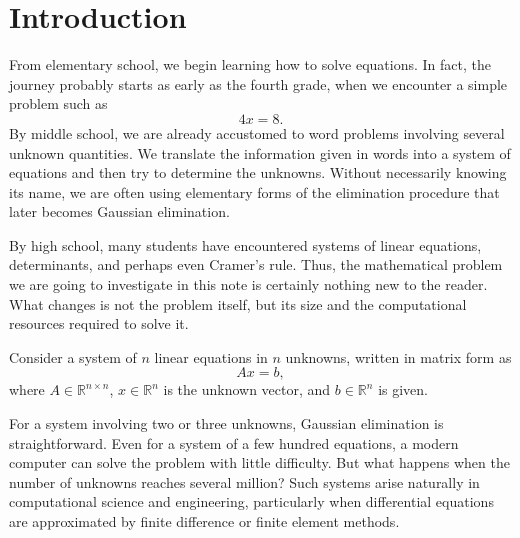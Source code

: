 \documentclass[11pt,a4paper]{article}
\theoremstyle{definition}
\theoremstyle{remark}
\begin{document}
\begin{abstract}
The development of optimal relaxation methods
represents a remarkable chapter in the history
of numerical computation. Its mathematical
elegance, practical significance, and long
historical development deserve closer attention.
It is therefore somewhat surprising that the
derivation of optimal relaxation parameters
receives relatively limited treatment in many
undergraduate textbooks, and instructors often overlook it. We hope
that the present discussion will help illuminate
both the mathematics and the significance of
this important subject.

\end{abstract}

\tableofcontents
\newpage



\section{Introduction}

From elementary school, we begin learning how to solve
equations. In fact, the journey probably starts as early
as the fourth grade, when we encounter a simple problem
such as
\[
    4x=8.
\]
By middle school, we are already accustomed to word
problems involving several unknown quantities. We
translate the information given in words into a system
of equations and then try to determine the unknowns.
Without necessarily knowing its name, we are often
using elementary forms of the elimination procedure
that later becomes Gaussian elimination.

By high school, many students have encountered systems
of linear equations, determinants, and perhaps even
Cramer's rule. Thus, the mathematical problem we are
going to investigate in this note is certainly nothing
new to the reader. What changes is not the problem
itself, but its size and the computational resources
required to solve it.

Consider a system of $n$ linear equations in $n$
unknowns, written in matrix form as
\[
    Ax=b,
\]
where $A\in\mathbb{R}^{n\times n}$,
$x\in\mathbb{R}^n$ is the unknown vector, and
$b\in\mathbb{R}^n$ is given.

For a system involving two or three unknowns, Gaussian
elimination is straightforward. Even for a system of
a few hundred equations, a modern computer can solve
the problem with little difficulty. But what happens
when the number of unknowns reaches several million?
Such systems arise naturally in computational science
and engineering, particularly when differential
equations are approximated by finite difference or
finite element methods.
\end{document}
